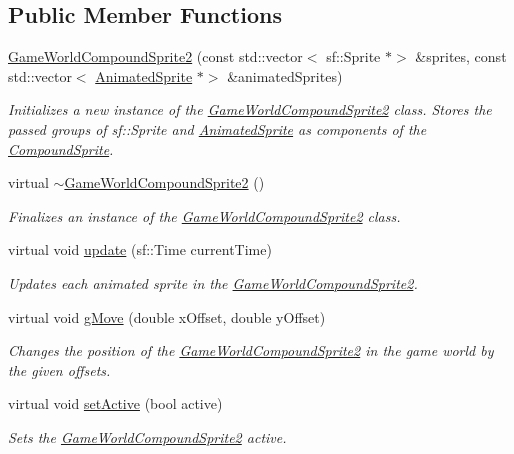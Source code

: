 \subsection*{Public Member Functions}
\begin{DoxyCompactItemize}
\item 
\hyperlink{class_game_world_compound_sprite2_a09c16ebe74d35c5d56259ec8b1f6c8ca}{Game\+World\+Compound\+Sprite2} (const std\+::vector$<$ sf\+::\+Sprite $\ast$$>$ \&sprites, const std\+::vector$<$ \hyperlink{class_animated_sprite}{Animated\+Sprite} $\ast$$>$ \&animated\+Sprites)
\begin{DoxyCompactList}\small\item\em Initializes a new instance of the \hyperlink{class_game_world_compound_sprite2}{Game\+World\+Compound\+Sprite2} class. Stores the passed groups of sf\+::\+Sprite and \hyperlink{class_animated_sprite}{Animated\+Sprite} as components of the \hyperlink{class_compound_sprite}{Compound\+Sprite}. \end{DoxyCompactList}\item 
virtual \hyperlink{class_game_world_compound_sprite2_ab1a2a138336d0046521df6693cf88db5}{$\sim$\+Game\+World\+Compound\+Sprite2} ()
\begin{DoxyCompactList}\small\item\em Finalizes an instance of the \hyperlink{class_game_world_compound_sprite2}{Game\+World\+Compound\+Sprite2} class. \end{DoxyCompactList}\item 
virtual void \hyperlink{class_game_world_compound_sprite2_a068bdce311f91566550409016df88489}{update} (sf\+::\+Time current\+Time)
\begin{DoxyCompactList}\small\item\em Updates each animated sprite in the \hyperlink{class_game_world_compound_sprite2}{Game\+World\+Compound\+Sprite2}. \end{DoxyCompactList}\item 
virtual void \hyperlink{class_game_world_compound_sprite2_aa45dc19c6010d86e90832f129dd1e327}{g\+Move} (double x\+Offset, double y\+Offset)
\begin{DoxyCompactList}\small\item\em Changes the position of the \hyperlink{class_game_world_compound_sprite2}{Game\+World\+Compound\+Sprite2} in the game world by the given offsets. \end{DoxyCompactList}\item 
virtual void \hyperlink{class_game_world_compound_sprite2_a773426feff97b69af22941f84a7ee40c}{set\+Active} (bool active)
\begin{DoxyCompactList}\small\item\em Sets the \hyperlink{class_game_world_compound_sprite2}{Game\+World\+Compound\+Sprite2} active. \end{DoxyCompactList}\end{DoxyCompactItemize}

